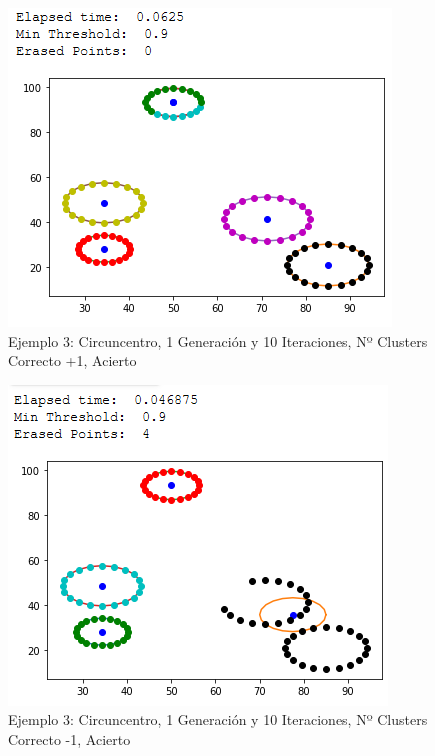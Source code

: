 \documentclass[conference,a4paper]{IEEEtran}
\begin{document}
\begin{figure}[H]
\centering
\includegraphics[scale=0.65]{Experimentacion/Ejemplo3/ej3_c_1_10_mc_correct2}
\caption{Ejemplo 3: Circuncentro, 1 Generación y 10 Iteraciones,  Nº Clusters Correcto +1, Acierto\\}
\end{figure}

\begin{figure}[H]
\centering
\includegraphics[scale=0.65]{Experimentacion/Ejemplo3/ej3_c_1_10_lc}
\caption{Ejemplo 3: Circuncentro, 1 Generación y 10 Iteraciones,  Nº Clusters Correcto -1, Acierto\\}
\end{figure}
\end{document}
